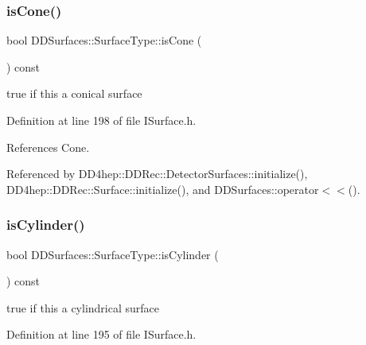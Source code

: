 \hypertarget{class_d_d_surfaces_1_1_surface_type_aae3940eb9d84d8695b73291a006e9d87}{}\label{class_d_d_surfaces_1_1_surface_type_aae3940eb9d84d8695b73291a006e9d87} 
\subsubsection{\texorpdfstring{is\+Cone()}{isCone()}}
{\footnotesize\ttfamily bool D\+D\+Surfaces\+::\+Surface\+Type\+::is\+Cone (\begin{DoxyParamCaption}{ }\end{DoxyParamCaption}) const\hspace{0.3cm}{\ttfamily [inline]}}



true if this a conical surface 



Definition at line 198 of file I\+Surface.\+h.



References Cone.



Referenced by D\+D4hep\+::\+D\+D\+Rec\+::\+Detector\+Surfaces\+::initialize(), D\+D4hep\+::\+D\+D\+Rec\+::\+Surface\+::initialize(), and D\+D\+Surfaces\+::operator$<$$<$().

\hypertarget{class_d_d_surfaces_1_1_surface_type_a414afb21b662a7fe88aac14a8c885090}{}\label{class_d_d_surfaces_1_1_surface_type_a414afb21b662a7fe88aac14a8c885090} 
\subsubsection{\texorpdfstring{is\+Cylinder()}{isCylinder()}}
{\footnotesize\ttfamily bool D\+D\+Surfaces\+::\+Surface\+Type\+::is\+Cylinder (\begin{DoxyParamCaption}{ }\end{DoxyParamCaption}) const\hspace{0.3cm}{\ttfamily [inline]}}



true if this a cylindrical surface 



Definition at line 195 of file I\+Surface.\+h.



